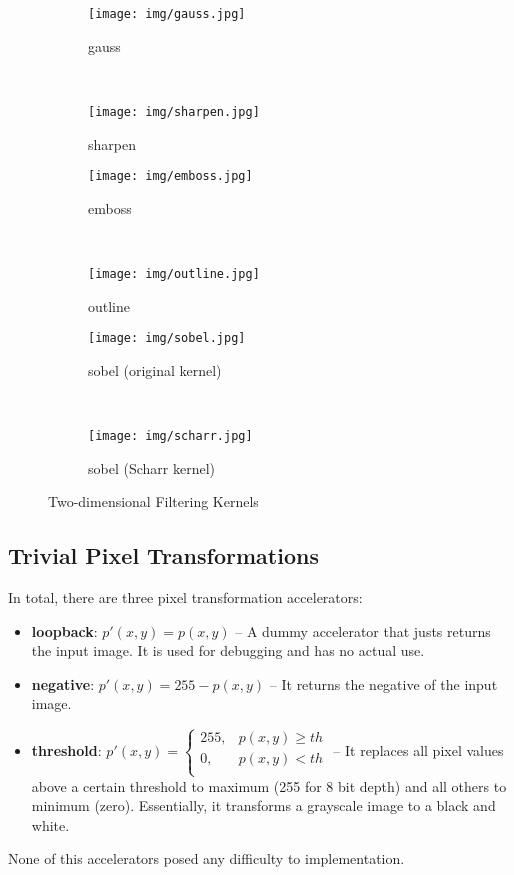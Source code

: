 \begin{figure}[tb!]
\centering
\begin{subfigure}[b]{.49\linewidth}
	\texttt{[image: img/gauss.jpg]}
	\caption{gauss}
\end{subfigure}
~
\begin{subfigure}[b]{.49\linewidth}
	\texttt{[image: img/sharpen.jpg]}
	\caption{sharpen}
\end{subfigure}
\par\bigskip
\begin{subfigure}[b]{.49\linewidth}
	\texttt{[image: img/emboss.jpg]}
	\caption{emboss}
\end{subfigure}
~
\begin{subfigure}[b]{.49\linewidth}
	\texttt{[image: img/outline.jpg]}
	\caption{outline}
\end{subfigure}
\par\bigskip
\begin{subfigure}[b]{.49\linewidth}
	\texttt{[image: img/sobel.jpg]}
	\caption{sobel (original kernel)}
\end{subfigure}
~
\begin{subfigure}[b]{.49\linewidth}
	\texttt{[image: img/scharr.jpg]}
	\caption{sobel (Scharr kernel)}
\end{subfigure}
\caption{Two-dimensional Filtering Kernels}
\label{fig:2d-filters}
\end{figure}

\subsection{Trivial Pixel Transformations}

In total, there are three pixel transformation accelerators:

\begin{itemize}
\item	\textbf{loopback}: $p'(x,y)=p(x,y)$ -- A dummy accelerator that justs returns the input image.
	It is used for debugging and has no actual use.
\item	\textbf{negative}: $p'(x,y) = 255 - p(x,y)$ -- It returns the negative of the input image.
\item	\textbf{threshold}: 
	$ p'(x,y) = \left\{
	\begin{array}{ll}
		255, 	& p(x,y) \geq th\\
		0,	& p(x,y) < th\\
	\end{array} 
	\right. 
	$ -- It replaces all pixel values above a certain threshold to maximum (255 for 8 bit
	depth) and all others to minimum (zero). Essentially, it transforms a grayscale
	image to a black and white.
\end{itemize}
None of this accelerators posed any difficulty to implementation.


